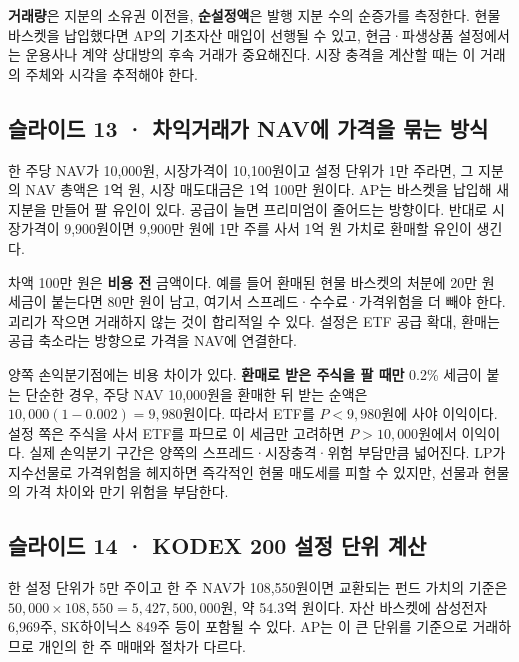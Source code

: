\documentclass[11pt,a4paper]{article}
\begin{document}
\textbf{거래량}은 지분의 소유권 이전을, \textbf{순설정액}은 발행 지분 수의 순증가를 측정한다. 현물 바스켓을 납입했다면 AP의 기초자산 매입이 선행될 수 있고, 현금·파생상품 설정에서는 운용사나 계약 상대방의 후속 거래가 중요해진다. 시장 충격을 계산할 때는 이 거래의 주체와 시각을 추적해야 한다.\par

\subsection{슬라이드 13 · 차익거래가 NAV에 가격을 묶는 방식}
한 주당 NAV가 10,000원, 시장가격이 10,100원이고 설정 단위가 1만 주라면, 그 지분의 NAV 총액은 1억 원, 시장 매도대금은 1억 100만 원이다. AP는 바스켓을 납입해 새 지분을 만들어 팔 유인이 있다. 공급이 늘면 프리미엄이 줄어드는 방향이다. 반대로 시장가격이 9,900원이면 9,900만 원에 1만 주를 사서 1억 원 가치로 환매할 유인이 생긴다.\par

차액 100만 원은 \textbf{비용 전} 금액이다. 예를 들어 환매된 현물 바스켓의 처분에 20만 원 세금이 붙는다면 80만 원이 남고, 여기서 스프레드·수수료·가격위험을 더 빼야 한다. 괴리가 작으면 거래하지 않는 것이 합리적일 수 있다. 설정은 ETF 공급 확대, 환매는 공급 축소라는 방향으로 가격을 NAV에 연결한다.\par

양쪽 손익분기점에는 비용 차이가 있다. \textbf{환매로 받은 주식을 팔 때만} 0.2\% 세금이 붙는 단순한 경우, 주당 NAV 10,000원을 환매한 뒤 받는 순액은 $10{,}000(1-0.002)=9{,}980$원이다. 따라서 ETF를 $P<9{,}980$원에 사야 이익이다. 설정 쪽은 주식을 사서 ETF를 파므로 이 세금만 고려하면 $P>10{,}000$원에서 이익이다. 실제 손익분기 구간은 양쪽의 스프레드·시장충격·위험 부담만큼 넓어진다. LP가 지수선물로 가격위험을 헤지하면 즉각적인 현물 매도세를 피할 수 있지만, 선물과 현물의 가격 차이와 만기 위험을 부담한다.\par

\subsection{슬라이드 14 · KODEX 200 설정 단위 계산}
한 설정 단위가 5만 주이고 한 주 NAV가 108,550원이면 교환되는 펀드 가치의 기준은 $50{,}000\times108{,}550=5{,}427{,}500{,}000$원, 약 54.3억 원이다. 자산 바스켓에 삼성전자 6,969주, SK하이닉스 849주 등이 포함될 수 있다. AP는 이 큰 단위를 기준으로 거래하므로 개인의 한 주 매매와 절차가 다르다.\par
\end{document}
